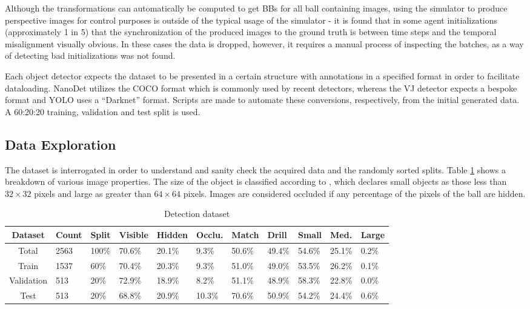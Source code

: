 \documentclass[a4paper,twoside,12pt]{report}
\begin{document}
Although the transformations can automatically be computed to get BBs for all ball containing images, using the simulator to produce perspective images for control purposes is outside of the typical usage of the simulator - it is found that in some agent initializations (approximately 1 in 5) that the synchronization of the produced images to the ground truth is between time steps and the temporal misalignment visually obvious. In these cases the data is dropped, however, it requires a manual process of inspecting the batches, as a way of detecting bad initializations was not found.

Each object detector expects the dataset to be presented in a certain structure with annotations in a specified format in order to facilitate dataloading. NanoDet utilizes the COCO format \citep{cocodataset} which is commonly used by recent detectors, whereas the VJ detector expects a bespoke format \citep{vjdataset} and YOLO uses a ``Darknet'' format. Scripts are made to automate these conversions, respectively, from the initial generated data. A 60:20:20 training, validation and test split is used.

\subsection{Data Exploration}
The dataset is interrogated in order to understand and sanity check the acquired data and the randomly sorted splits. Table \ref{tab:detection} shows a breakdown of various image properties. The size of the object is classified according to \cite{cocoeval}, which declares small objects as those less than $32\times32$ pixels and large as greater than $64\times64$ pixels. Images are considered occluded if any percentage of the pixels of the ball are hidden.

\begin{table}[h!]
\fontsize{9.5pt}{12pt}\selectfont
\centering
\begin{tabular}{c|ll|lll|ll|lll}
{\bf Dataset}	&{\bf Count}	&{\bf Split}	&{\bf Visible}	&{\bf Hidden}	&{\bf Occlu.}	&{\bf Match}	&{\bf Drill}	&{\bf Small}	&{\bf Med.}	&{\bf Large}	\\\hline
Total			&2563			&100\%			&70.6\%			&20.1\%			&9.3\%			&50.6\%			&49.4\%			&54.6\%			&25.1\%			&0.2\%			\\\hline   
Train			&1537			&60\%			&70.4\%			&20.3\%			&9.3\%			&51.0\%			&49.0\%			&53.5\%			&26.2\%			&0.1\%			\\\hline  
Validation		&513			&20\%			&72.9\%			&18.9\%			&8.2\%			&51.1\%			&48.9\%			&58.3\%			&22.8\%			&0.0\%			\\\hline  
Test			&513			&20\%			&68.8\%			&20.9\%			&10.3\%			&70.6\%			&50.9\%			&54.2\%			&24.4\%			&0.6\%			\\\hline                        
\end{tabular}
\caption{Detection dataset}
\label{tab:detection}
\end{table}
\end{document}
